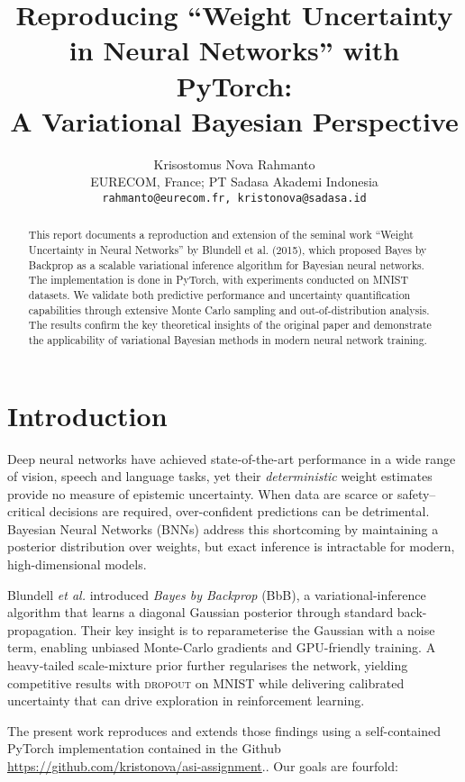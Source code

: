 \documentclass{article}
\title{Reproducing ``Weight Uncertainty in Neural Networks'' with PyTorch: \\ A Variational Bayesian Perspective}
\author{
  Krisostomus Nova Rahmanto \\
  EURECOM, France; PT Sadasa Akademi Indonesia \\
  \texttt{rahmanto@eurecom.fr, kristonova@sadasa.id} \\
}
\begin{document}
\maketitle

\begin{abstract}
This report documents a reproduction and extension of the seminal work ``Weight Uncertainty in Neural Networks'' by Blundell et al. (2015), which proposed Bayes by Backprop as a scalable variational inference algorithm for Bayesian neural networks. The implementation is done in PyTorch, with experiments conducted on MNIST datasets. We validate both predictive performance and uncertainty quantification capabilities through extensive Monte Carlo sampling and out-of-distribution analysis. The results confirm the key theoretical insights of the original paper and demonstrate the applicability of variational Bayesian methods in modern neural network training.
\end{abstract}

\section{Introduction}
Deep neural networks have achieved state‐of-the-art performance in a wide range of vision, speech and language tasks, yet their \emph{deterministic} weight estimates provide no measure of epistemic uncertainty.  When data are scarce or safety–critical decisions are required, over-confident predictions can be detrimental.  Bayesian Neural Networks (BNNs) address this shortcoming by maintaining a posterior distribution over weights, but exact inference is intractable for modern, high-dimensional models.

Blundell \textit{et al.} \cite{blundell2015weight} introduced \emph{Bayes by Backprop} (BbB), a variational-inference algorithm that learns a diagonal Gaussian posterior through standard back-propagation.  Their key insight is to reparameterise the Gaussian with a noise term, enabling unbiased Monte-Carlo gradients and GPU-friendly training.  A heavy‐tailed scale-mixture prior further regularises the network, yielding competitive results with \textsc{dropout} on MNIST while delivering calibrated uncertainty that can drive exploration in reinforcement learning.

The present work reproduces and extends those findings using a self-contained PyTorch implementation contained in the Github \href{https://github.com/kristonova/asi-assignment}{https://github.com/kristonova/asi-assignment}..  Our goals are fourfold:
\end{document}
